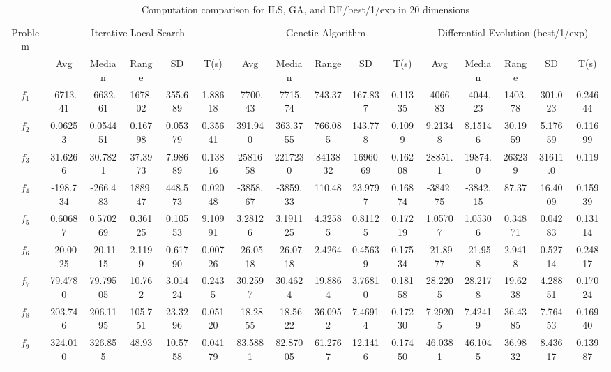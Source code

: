 \documentclass[paper=a4, fontsize=11pt]{scrartcl} %
\numberwithin{equation}{section} %
\numberwithin{figure}{section} %
\numberwithin{table}{section} %
\begin{document}
\begin{landscape}
	\begin{table}
		\tiny
		\centering
		\caption{Computation comparison for ILS, GA, and DE/best/1/exp in 20 dimensions}
		\label{Tab1d}
		\begin{tabular}{c|ccccc|ccccc|ccccc}
			\noalign{\smallskip}\hline\noalign{\smallskip}
			Problem & \multicolumn{5}{c}{Iterative Local Search}& \multicolumn{5}{|c|}{Genetic Algorithm}
			&  \multicolumn{5}{c}{Differential Evolution (best/1/exp)} \\ 
			\noalign{\smallskip}\hline\noalign{\smallskip}
			& Avg & Median & Range & SD & T(s) & Avg & Median
			& Range & SD & T(s) & Avg & Median & Range & SD &
			T(s) \\ 
			\noalign{\smallskip}\hline\noalign{\smallskip}
			$f_{1}$  & -6713.41 & -6632.61 & 1678.02 & 355.689 & 1.88618 & -7700.43 & -7715.74 & 743.37  & 167.837 & 0.11335 & -4066.83 & -4044.23 & 1403.78 & 301.023 & 0.24644\\
			$f_{2}$  &  0.06253 & 0.054451 & 0.16798 & 0.05379 & 0.35641 &  391.940 & 363.3755 & 766.085 & 143.778 & 0.1099  &  9.21348 &  8.15146 & 30.1959 & 5.17659 & 0.11699\\
			$f_{3}$  &  31.6266 & 30.7821  & 37.3973 & 7.98689 & 0.13816 &  2581658 & 2217230  & 8413832 & 1696069 & 0.16208 &  28851.1 &  19874.0 & 263239  & 31611.0 & 0.119  \\
			$f_{4}$  & -198.734 & -266.483 & 1889.47 & 448.573 & 0.02048 & -3858.67 & -3859.33 & 110.48  & 23.9797 & 0.16874 & -3842.75 & -3842.15 & 87.37   & 16.4009 & 0.15939\\
			$f_{5}$  &  0.60687 & 0.570269 & 0.36125 & 0.10553 & 9.10991 &  3.28126 & 3.191125 & 4.32585 & 0.81125 & 0.17219 &  1.05707 &  1.05306 & 0.34871 & 0.04283 & 0.13114\\
			$f_{6}$  & -20.0025 & -20.1115 & 2.1199  & 0.61790 & 0.00726 & -26.0518 & -26.0718 & 2.4264  & 0.45639 & 0.17534 & -21.8977 & -21.958  & 2.9418  & 0.52714 & 0.24817\\
			$f_{7}$  &  79.4780 & 79.79505 & 10.762  & 3.01424 & 0.2435  &  30.2597 & 30.4624  & 19.8864 & 3.76810 & 0.18158 &  28.2205 &  28.2178 & 19.6238 & 4.28851 & 0.17024\\
			$f_{8}$  &  203.746 & 206.1195 & 105.751 & 23.3296 & 0.05120 & -18.2855 & -18.5622 & 36.0952 & 7.46914 & 0.17230 &  7.29205 &  7.42419 & 36.4385 & 7.76453 & 0.16940\\
			$f_{9}$  &  324.010 & 326.855  & 48.93   & 10.5758 & 0.04179 &  83.5881 & 82.87005 & 61.2767 & 12.1416 & 0.17450 &  46.0381 &  46.1045 & 36.9832 & 8.43617 & 0.13987\\

\end{tabular}
\end{table}
\end{landscape}
\end{document}
